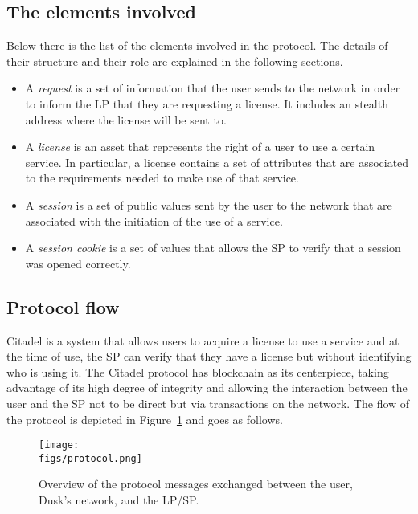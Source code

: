\subsection{The elements involved}

Below there is the list of the elements involved in the protocol. The details of their structure and their role are explained in the following sections. 

\begin{itemize}
	\item A \emph{request} is a set of information that the user sends to the network in order to inform the LP that they are requesting a license. It includes an stealth address where the license will be sent to.
	\item A \emph{license} is an asset that represents the right of a user to use a certain service. In particular, a license contains a set of attributes that are associated to the requirements needed to make use of that service.
	\item A \emph{session} is a set of public values sent by the user to the network that are associated with the initiation of the use of a service.
	\item A \emph{session cookie} is a set of values that allows the SP to verify that a session was opened correctly.
\end{itemize}


\subsection{Protocol flow}

Citadel is a system that allows users to acquire a license to use a service and at the time of use, the SP can verify that they have a license but without identifying who is using it. The Citadel protocol has blockchain as its centerpiece, taking advantage of its high degree of integrity and allowing the interaction between the user and the SP not to be direct but via transactions on the network. The flow of the protocol is depicted in Figure~\ref{fig:protocol} and goes as follows.

\begin{figure}[h]
	\centering
	\texttt{[image: \\figs/protocol.png]}
	\caption{Overview of the protocol messages exchanged between the user, Dusk's network, and the LP/SP.}
	\label{fig:protocol}
\end{figure}

